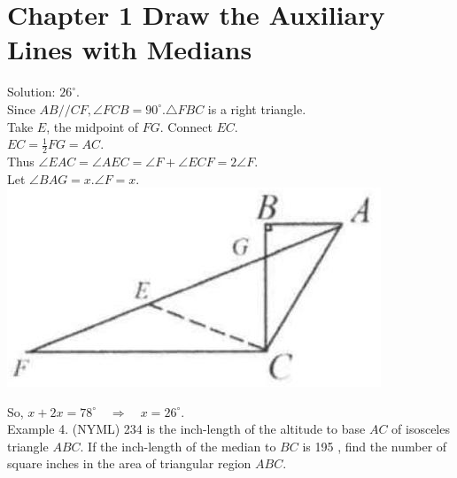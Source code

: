 \documentclass[10pt]{article}
\begin{document}
\section*{Chapter 1 Draw the Auxiliary Lines with Medians}
Solution: \(26^{\circ}\).\\
Since \(A B / / C F, \angle F C B=90^{\circ} . \triangle F B C\) is a right triangle.\\
Take \(E\), the midpoint of \(F G\). Connect \(E C\).\\
\(E C=\frac{1}{2} F G=A C\).\\
Thus \(\angle E A C=\angle A E C=\angle F+\angle E C F=2 \angle F\).\\
Let \(\angle B A G=x . \angle F=x\).\\
\includegraphics[max width=\textwidth, center]{2025_04_17_97bc1f7e44d93c271a88g-010(2)}

So, \(x+2 x=78^{\circ} \quad \Rightarrow \quad x=26^{\circ}\).\\
Example 4. (NYML) 234 is the inch-length of the altitude to base \(A C\) of isosceles triangle \(A B C\). If the inch-length of the median to \(B C\) is 195 , find the number of square inches in the area of triangular region \(A B C\).
\end{document}
